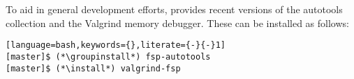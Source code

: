 To aid in general development efforts, \FSP{} provides recent versions of the \GNU{}
autotools collection and the Valgrind memory debugger. These can be installed as follows:

\begin{lstlisting}[language=bash,keywords={},literate={-}{-}1]
[master]$ (*\groupinstall*) fsp-autotools
[master]$ (*\install*) valgrind-fsp
\end{lstlisting}
